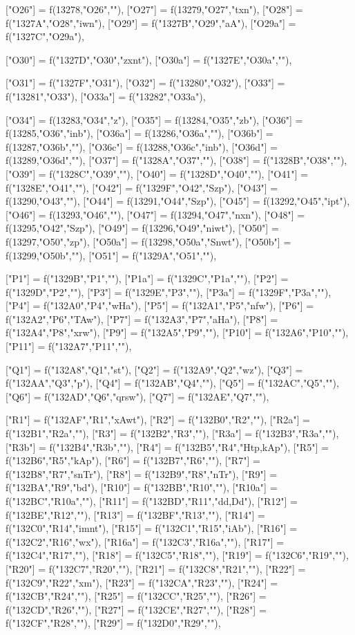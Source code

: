 \documentclass{article}
\begin{document}
\begin{luacode*}
{	["O26"] = f(13278,"O26",""),
	["O27"] = f(13279,"O27","txn"),
	["O28"] = f("1327A","O28","iwn"),
	["O29"] = f("1327B","O29","aA"),
	["O29a"] = f("1327C","O29a"),

	["O30"] = f("1327D","O30","zxnt"),
	["O30a"] = f("1327E","O30a",""),

	["O31"] = f("1327F","O31"),
	["O32"] = f("13280","O32"),
	["O33"] = f("13281","O33"),
	["O33a"] = f("13282","O33a"),

	["O34"] = f(13283,"O34","z"),
	["O35"] = f(13284,"O35","zb"),
	["O36"] = f(13285,"O36","inb"),
	["O36a"] = f(13286,"O36a",""),
	["O36b"] = f(13287,"O36b",""),
	["O36c"] = f(13288,"O36c","inb"),
	["O36d"] = f(13289,"O36d",""),
	["O37"] = f("1328A","O37",""),
	["O38"] = f("1328B","O38",""),
	["O39"] = f("1328C","O39",""),
	["O40"] = f("1328D","O40",""),
	["O41"] = f("1328E","O41",""),
	["O42"] = f("1329F","O42","Szp"),
	["O43"] = f(13290,"O43",""),
	["O44"] = f(13291,"O44","Szp"),
	["O45"] = f(13292,"O45","ipt"),
	["O46"] = f(13293,"O46",""),
	["O47"] = f(13294,"O47","nxn"),
	["O48"] = f(13295,"O42","Szp"),
	["O49"] = f(13296,"O49","niwt"),
	["O50"] = f(13297,"O50","zp"),
	["O50a"] = f(13298,"O50a","Snwt"),
	["O50b"] = f(13299,"O50b",""),
	["O51"] = f("1329A","O51",""),

	["P1"] = f("1329B","P1",""),
	["P1a"] = f("1329C","P1a",""),
	["P2"] = f("1329D","P2",""),
	["P3"] = f("1329E","P3",""),
	["P3a"] = f("1329F","P3a",""),
	["P4"] = f("132A0","P4","wHa"),
	["P5"] = f("132A1","P5","nfw"),
	["P6"] = f("132A2","P6","TAw"),
	["P7"] = f("132A3","P7","aHa"),
	["P8"] = f("132A4","P8","xrw"),
	["P9"] = f("132A5","P9",""),
	["P10"] = f("132A6","P10",""),
	["P11"] = f("132A7","P11",""),


	["Q1"] = f("132A8","Q1","st"),
	["Q2"] = f("132A9","Q2","wz"),
	["Q3"] = f("132AA","Q3","p"),
	["Q4"] = f("132AB","Q4",""),
	["Q5"] = f("132AC","Q5",""),
	["Q6"] = f("132AD","Q6","qrsw"),
	["Q7"] = f("132AE","Q7",""),


	["R1"] = f("132AF","R1","xAwt"),
	["R2"] = f("132B0","R2",""),
	["R2a"] = f("132B1","R2a",""),
	["R3"] = f("132B2","R3",""),
	["R3a"] = f("132B3","R3a",""),
	["R3b"] = f("132B4","R3b",""),
	["R4"] = f("132B5","R4","Htp,kAp"),
	["R5"] = f("132B6","R5","kAp"),
	["R6"] = f("132B7","R6",""),
	["R7"] = f("132B8","R7","snTr"),
	["R8"] = f("132B9","R8","nTr"),
	["R9"] = f("132BA","R9","bd"),
	["R10"] = f("132BB","R10",""),
	["R10a"] = f("132BC","R10a",""),
	["R11"] = f("132BD","R11","dd,Dd"),
	["R12"] = f("132BE","R12",""),
	["R13"] = f("132BF","R13",""),
	["R14"] = f("132C0","R14","imnt"),
	["R15"] = f("132C1","R15","iAb"),
	["R16"] = f("132C2","R16","wx"),
	["R16a"] = f("132C3","R16a",""),
	["R17"] = f("132C4","R17",""),
	["R18"] = f("132C5","R18",""),
	["R19"] = f("132C6","R19",""),
	["R20"] = f("132C7","R20",""),
	["R21"] = f("132C8","R21",""),
	["R22"] = f("132C9","R22","xm"),
	["R23"] = f("132CA","R23",""),
	["R24"] = f("132CB","R24",""),
	["R25"] = f("132CC","R25",""),
	["R26"] = f("132CD","R26",""),
	["R27"] = f("132CE","R27",""),
	["R28"] = f("132CF","R28",""),
	["R29"] = f("132D0","R29",""),


}
\end{luacode*}
\end{document}
